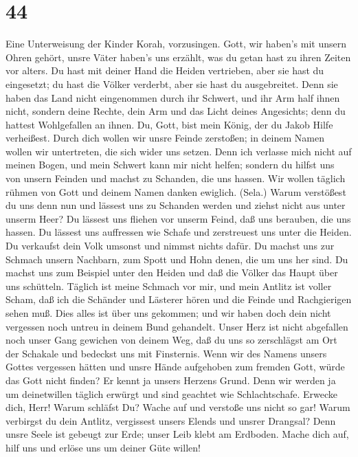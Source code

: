 \hypertarget{section-43}{%
\section{44}\label{section-43}}

 Eine Unterweisung der Kinder Korah, vorzusingen. Gott, wir
haben's mit unsern Ohren gehört, unsre Väter haben's uns erzählt, was du
getan hast zu ihren Zeiten vor alters.  Du hast mit deiner
Hand die Heiden vertrieben, aber sie hast du eingesetzt; du hast die
Völker verderbt, aber sie hast du ausgebreitet.  Denn sie
haben das Land nicht eingenommen durch ihr Schwert, und ihr Arm half
ihnen nicht, sondern deine Rechte, dein Arm und das Licht deines
Angesichts; denn du hattest Wohlgefallen an ihnen.  Du,
Gott, bist mein König, der du Jakob Hilfe verheißest.  Durch
dich wollen wir unsre Feinde zerstoßen; in deinem Namen wollen wir
untertreten, die sich wider uns setzen.  Denn ich verlasse
mich nicht auf meinen Bogen, und mein Schwert kann mir nicht helfen;
 sondern du hilfst uns von unsern Feinden und machst zu
Schanden, die uns hassen.  Wir wollen täglich rühmen von
Gott und deinem Namen danken ewiglich. (Sela.)  Warum
verstößest du uns denn nun und lässest uns zu Schanden werden und ziehst
nicht aus unter unserm Heer?  Du lässest uns fliehen vor
unserm Feind, daß uns berauben, die uns hassen.  Du lässest
uns auffressen wie Schafe und zerstreuest uns unter die Heiden.
 Du verkaufst dein Volk umsonst und nimmst nichts dafür.
 Du machst uns zur Schmach unsern Nachbarn, zum Spott und
Hohn denen, die um uns her sind.  Du machst uns zum
Beispiel unter den Heiden und daß die Völker das Haupt über uns
schütteln.  Täglich ist meine Schmach vor mir, und mein
Antlitz ist voller Scham,  daß ich die Schänder und
Lästerer hören und die Feinde und Rachgierigen sehen muß. 
Dies alles ist über uns gekommen; und wir haben doch dein nicht
vergessen noch untreu in deinem Bund gehandelt.  Unser Herz
ist nicht abgefallen noch unser Gang gewichen von deinem Weg,
 daß du uns so zerschlägst am Ort der Schakale und bedeckst
uns mit Finsternis.  Wenn wir des Namens unsers Gottes
vergessen hätten und unsre Hände aufgehoben zum fremden Gott,
 würde das Gott nicht finden? Er kennt ja unsers Herzens
Grund.  Denn wir werden ja um deinetwillen täglich erwürgt
und sind geachtet wie Schlachtschafe.  Erwecke dich, Herr!
Warum schläfst Du? Wache auf und verstoße uns nicht so gar!
 Warum verbirgst du dein Antlitz, vergissest unsers Elends
und unsrer Drangsal?  Denn unsre Seele ist gebeugt zur
Erde; unser Leib klebt am Erdboden.  Mache dich auf, hilf
uns und erlöse uns um deiner Güte willen!

